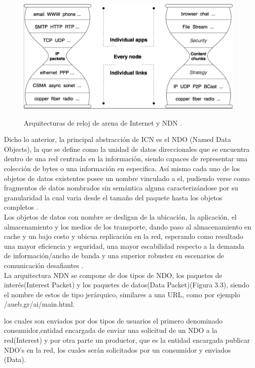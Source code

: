\documentclass[12pt]{ociamthesis}  %
\begin{document}
	\begin{figure}[!htb]
		\centering
		\includegraphics[width=12cm]{Protocolo_IP_vs_NDN.png}\\
		\caption{Arquitecturas de reloj de arena de Internet y NDN \cite{named_data_networking}.}
		\label{fig:mesh1}
	\end{figure}

Dicho lo anterior, la principal abstracción de ICN es el NDO (Named Data Objects), la que se define como la unidad de datos direccionales que se encuentra dentro de una red centrada en la información, siendo capaces de representar una colección de bytes o una información en especifica. Así mismo cada uno de los objetos de datos existentes posee un nombre vinculado a el, pudiendo verse como fragmentos de datos nombrados sin semántica alguna caracterizándose por su granularidad la cual varia desde el tamaño del paquete hasta los objetos completos \cite{kutscher2016information}\cite{ahlgren2012survey}.\\

Los objetos de datos con nombre se desligan de la ubicación, la aplicación, el almacenamiento y los medios de los transporte, dando paso al almacenamiento en cache y un bajo costo y ubicua replicación en la red, esperando como resultado una mayor eficiencia y seguridad, una mayor escabilidad respecto a la demanda de información/ancho de banda y una superior robustez en escenarios de comunicación desafiantes \cite{kutscher2016information}.\\

La arquitectura NDN se compone de dos tipos de NDO, los paquetes de interés(Interest Packet) y los paquetes de datos(Data Packet)(Figura 3.3), siendo el nombre de estos de tipo jerárquico, similares a una URL, como por ejemplo /aueb.gr/ai/main.html.

los cuales son enviados por dos tipos de usuarios el primero denominado consumidor,entidad encargada de enviar una solicitud de un NDO a la red(Interest) y por otra parte un productor, que es la entidad encargada publicar NDO's en la red, los cuales serán solicitados por un consumidor y enviados (Data).\\
\end{document}
